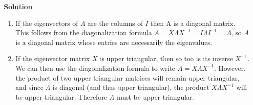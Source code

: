 \documentclass[11pt]{article}
\begin{document}
\noindent \textbf{Solution}\\
\begin{enumerate}
\item If the eigenvectors of $A$ are the columns of $I$ then A is a diagonal matrix. This follows from the diagonalization formula $A = X\Lambda X^{-1} = I\Lambda I^{-1} = \Lambda$, so $A$ is a diagonal matrix whose entries are necessarily the eigenvalues.

\item If the eigenvector matrix $X$ is upper triangular, then so too is its inverse $X^{-1}$. We can then use the diagonalization formula to write $A=X\Lambda X^{-1}$. However, the product of two upper triangular matrices will remain upper triangular, and since $\Lambda$ is diagonal (and thus upper triangular), the product $X\Lambda X^{-1}$ will be upper triangular. Therefore $A$ must be upper triangular. 
\end{enumerate}

\newpage
\end{document}
